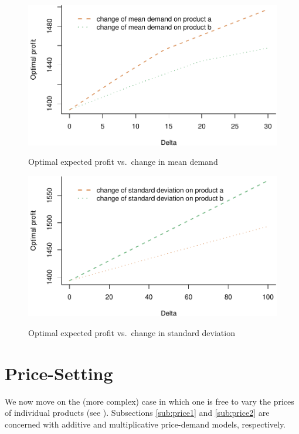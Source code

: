 \documentclass[a4paper,11pt]{article}
\begin{document}
\begin{figure}[htb]
\centering
\caption{Optimal expected profit vs.\ change in mean demand}
\includegraphics{Example-figure_files/figure-latex/mean-1.pdf}
\label{fig:simple1}
\end{figure}

\begin{figure}[htb]
\centering
\caption{Optimal expected profit vs.\ change in standard deviation}
\includegraphics{Example-figure_files/figure-latex/var-1.pdf}
\label{fig:simple2}
\end{figure}

\section{Price-Setting}
\label{se:price}

We now move on the (more complex) case in which one is free to vary the prices of individual products (see \cite{De20}). Subsections \ref{sub:price1} and \ref{sub:price2} are concerned with additive and multiplicative price-demand models, respectively.
\end{document}
